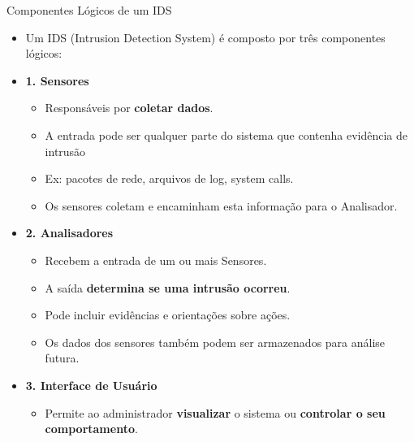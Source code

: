 \begin{frame}{Componentes Lógicos de um IDS}
    \begin{itemize}
        \item Um IDS (Intrusion Detection System) é composto por três componentes lógicos:

        \item \textbf{1. Sensores }
              \begin{itemize}
                  \item Responsáveis por \textbf{coletar dados}.
                  \item A entrada pode ser qualquer parte do sistema que contenha evidência de intrusão
                  \item Ex: pacotes de rede, arquivos de log, system calls.
                  \item Os sensores coletam e encaminham esta informação para o Analisador.
              \end{itemize}

        \item \textbf{2. Analisadores }
              \begin{itemize}
                  \item Recebem a entrada de um ou mais Sensores.
                  \item A saída \textbf{determina se uma intrusão ocorreu}.
                  \item Pode incluir evidências e orientações sobre ações.
                  \item Os dados dos sensores também podem ser armazenados para análise futura.
              \end{itemize}

        \item \textbf{3. Interface de Usuário }
              \begin{itemize}
                  \item Permite ao administrador \textbf{visualizar} o sistema ou \textbf{controlar o seu comportamento}.

              \end{itemize}
    \end{itemize}
\end{frame}

